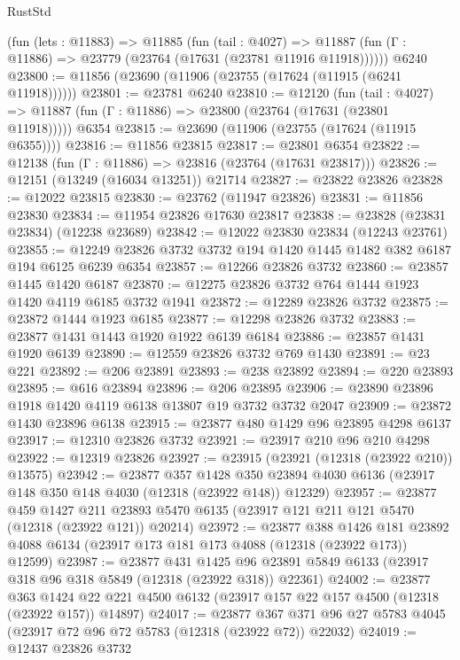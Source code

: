 \begin{lexlean}{RustStd}
\begin{coremodule}
    (fun (lets : @11883) =>
    @11885
      (fun (tail : @4027) =>
      @11887 (fun (Γ : @11886) => @23779 (@23764 (@17631 (@23781 @11916 @11918))))))
    @6240
@23800 := @11856 (@23690 (@11906 (@23755 (@17624 (@11915 (@6241 @11918))))))
@23801 := @23781 @6240
@23810 := @12120
    (fun (tail : @4027) => @11887 (fun (Γ : @11886) => @23800 (@23764 (@17631 (@23801 @11918)))))
    @6354
@23815 := @23690 (@11906 (@23755 (@17624 (@11915 @6355))))
@23816 := @11856 @23815
@23817 := @23801 @6354
@23822 := @12138 (fun (Γ : @11886) => @23816 (@23764 (@17631 @23817)))
@23826 := @12151 (@13249 (@16034 @13251)) @21714
@23827 := @23822 @23826
@23828 := @12022 @23815
@23830 := @23762 (@11947 @23826)
@23831 := @11856 @23830
@23834 := @11954 @23826 @17630 @23817
@23838 := @23828 (@23831 @23834) (@12238 @23689)
@23842 := @12022 @23830 @23834 (@12243 @23761)
@23855 := @12249 @23826 @3732 @3732 @194 @1420 @1445 @1482 @382 @6187 @194 @6125 @6239 @6354
@23857 := @12266 @23826 @3732
@23860 := @23857 @1445 @1420 @6187
@23870 := @12275 @23826 @3732 @764 @1444 @1923 @1420 @4119 @6185 @3732 @1941
@23872 := @12289 @23826 @3732
@23875 := @23872 @1444 @1923 @6185
@23877 := @12298 @23826 @3732
@23883 := @23877 @1431 @1443 @1920 @1922 @6139 @6184
@23886 := @23857 @1431 @1920 @6139
@23890 := @12559 @23826 @3732 @769 @1430
@23891 := @23 @221
@23892 := @206 @23891
@23893 := @238 @23892
@23894 := @220 @23893
@23895 := @616 @23894
@23896 := @206 @23895
@23906 := @23890 @23896 @1918 @1420 @4119 @6138 @13807 @19 @3732 @3732 @2047
@23909 := @23872 @1430 @23896 @6138
@23915 := @23877 @480 @1429 @96 @23895 @4298 @6137
@23917 := @12310 @23826 @3732
@23921 := @23917 @210 @96 @210 @4298
@23922 := @12319 @23826
@23927 := @23915 (@23921 (@12318 (@23922 @210)) @13575)
@23942 := @23877
    @357
    @1428
    @350
    @23894
    @4030
    @6136
    (@23917 @148 @350 @148 @4030 (@12318 (@23922 @148)) @12329)
@23957 := @23877
    @459
    @1427
    @211
    @23893
    @5470
    @6135
    (@23917 @121 @211 @121 @5470 (@12318 (@23922 @121)) @20214)
@23972 := @23877
    @388
    @1426
    @181
    @23892
    @4088
    @6134
    (@23917 @173 @181 @173 @4088 (@12318 (@23922 @173)) @12599)
@23987 := @23877
    @431
    @1425
    @96
    @23891
    @5849
    @6133
    (@23917 @318 @96 @318 @5849 (@12318 (@23922 @318)) @22361)
@24002 := @23877
    @363
    @1424
    @22
    @221
    @4500
    @6132
    (@23917 @157 @22 @157 @4500 (@12318 (@23922 @157)) @14897)
@24017 := @23877
    @367
    @371
    @96
    @27
    @5783
    @4045
    (@23917 @72 @96 @72 @5783 (@12318 (@23922 @72)) @22032)
@24019 := @12437 @23826 @3732

\end{coremodule}
\end{lexlean}
